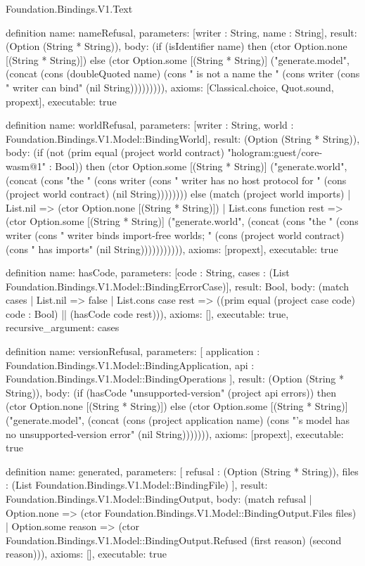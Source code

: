 \begin{lexlean}{Foundation.Bindings.V1.Text}
\begin{semanticmodule}
definition{
  name: nameRefusal,
  parameters: [writer : String, name : String],
  result: (Option (String * String)),
  body: (if (isIdentifier name) then (ctor Option.none [(String * String)]) else (ctor Option.some [(String * String)] ("generate.model", (concat (cons (doubleQuoted name) (cons " is not a name the " (cons writer (cons " writer can bind" (nil String))))))))),
  axioms: [Classical.choice, Quot.sound, propext],
  executable: true
}

definition{
  name: worldRefusal,
  parameters: [writer : String, world : Foundation.Bindings.V1.Model::BindingWorld],
  result: (Option (String * String)),
  body: (if (not (prim equal (project world contract) "hologram:guest/core-wasm@1" : Bool)) then (ctor Option.some [(String * String)] ("generate.world", (concat (cons "the " (cons writer (cons " writer has no host protocol for " (cons (project world contract) (nil String)))))))) else (match (project world imports)
    | List.nil => (ctor Option.none [(String * String)])
    | List.cons function rest => (ctor Option.some [(String * String)] ("generate.world", (concat (cons "the " (cons writer (cons " writer binds import-free worlds; " (cons (project world contract) (cons " has imports" (nil String))))))))))),
  axioms: [propext],
  executable: true
}

definition{
  name: hasCode,
  parameters: [code : String, cases : (List Foundation.Bindings.V1.Model::BindingErrorCase)],
  result: Bool,
  body: (match cases
    | List.nil => false
    | List.cons case rest => ((prim equal (project case code) code : Bool) || (hasCode code rest))),
  axioms: [],
  executable: true,
  recursive_argument: cases
}

definition{
  name: versionRefusal,
  parameters: [
    application : Foundation.Bindings.V1.Model::BindingApplication,
    api : Foundation.Bindings.V1.Model::BindingOperations
  ],
  result: (Option (String * String)),
  body: (if (hasCode "unsupported-version" (project api errors)) then (ctor Option.none [(String * String)]) else (ctor Option.some [(String * String)] ("generate.model", (concat (cons (project application name) (cons "'s model has no unsupported-version error" (nil String))))))),
  axioms: [propext],
  executable: true
}

definition{
  name: generated,
  parameters: [
    refusal : (Option (String * String)),
    files : (List Foundation.Bindings.V1.Model::BindingFile)
  ],
  result: Foundation.Bindings.V1.Model::BindingOutput,
  body: (match refusal
    | Option.none => (ctor Foundation.Bindings.V1.Model::BindingOutput.Files files)
    | Option.some reason => (ctor Foundation.Bindings.V1.Model::BindingOutput.Refused (first reason) (second reason))),
  axioms: [],
  executable: true
}


\end{semanticmodule}
\end{lexlean}
